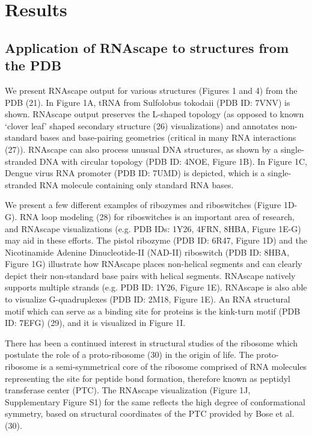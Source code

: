 \section{Results}
\subsection{Application of RNAscape to structures from the PDB}

We present RNAscape output for various structures (Figures 1 and 4) from the PDB (21). In Figure 1A, tRNA from Sulfolobus tokodaii (PDB ID: 7VNV) is shown. RNAscape output preserves the L-shaped topology (as opposed to known ‘clover leaf’ shaped secondary structure (26) visualizations) and annotates non-standard bases and base-pairing geometries (critical in many RNA interactions (27)). RNAscape can also process unusual DNA structures, as shown by a single-stranded DNA with circular topology (PDB ID: 4NOE, Figure 1B). In Figure 1C, Dengue virus RNA promoter (PDB ID: 7UMD) is depicted, which is a single-stranded RNA molecule containing only standard RNA bases.

We present a few different examples of ribozymes and riboswitches (Figure 1D-G). RNA loop modeling (28) for riboswitches is an important area of research, and RNAscape visualizations (e.g. PDB IDs: 1Y26, 4FRN, 8HBA, Figure 1E-G) may aid in these efforts. The pistol ribozyme (PDB ID: 6R47, Figure 1D) and the Nicotinamide Adenine Dinucleotide-II (NAD-II) riboswitch (PDB ID: 8HBA, Figure 1G) illustrate how RNAscape places non-helical segments and can clearly depict their non-standard base pairs with helical segments. RNAscape natively supports multiple strands (e.g. PDB ID: 1Y26, Figure 1E). RNAscape is also able to visualize G-quadruplexes (PDB ID: 2M18, Figure 1E). An RNA structural motif which can serve as a binding site for proteins is the kink-turn motif (PDB ID: 7EFG) (29), and it is visualized in Figure 1I.

There has been a continued interest in structural studies of the ribosome which postulate the role of a proto-ribosome (30) in the origin of life. The proto-ribosome is a semi-symmetrical core of the ribosome comprised of RNA molecules representing the site for peptide bond formation, therefore known as peptidyl transferase center (PTC). The RNAscape visualization (Figure 1J, Supplementary Figure S1) for the same reflects the high degree of conformational symmetry, based on structural coordinates of the PTC provided by Bose et al. (30).

